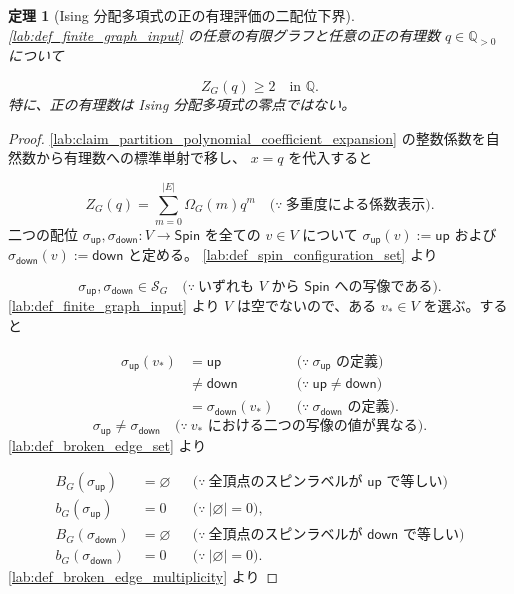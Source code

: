 \documentclass[11pt,a4paper]{article}
\newtheorem{theorem}[definition]{定理}
\theoremstyle{remark}
\begin{document}
\begin{theorem}[Ising 分配多項式の正の有理評価の二配位下界]\label{lab:theorem_no_positive_rational_root}
\cref{lab:def_finite_graph_input}
 の任意の有限グラフと任意の正の有理数 
$q\in\mathbb Q_{>0}$
 について

\[Z_G(q)\ge 2\quad\text{in }\mathbb Q.\]
特に、正の有理数は Ising 分配多項式の零点ではない。

\end{theorem}
\begin{proof}
\cref{lab:claim_partition_polynomial_coefficient_expansion}
 の整数係数を自然数から有理数への標準単射で移し、
$x=q$
 を代入すると

\[Z_G(q)
=\sum_{m=0}^{|E|}\Omega_G(m)q^m
\quad\bigl(\because\ \text{多重度による係数表示}\bigr).\]
二つの配位 
$\sigma_{\mathsf{up}},\sigma_{\mathsf{down}}:V\to\mathsf{Spin}$
 を全ての 
$v\in V$
 について 
$\sigma_{\mathsf{up}}(v):=\mathsf{up}$
 および 
$\sigma_{\mathsf{down}}(v):=\mathsf{down}$
 と定める。
\cref{lab:def_spin_configuration_set}
 より

\[\sigma_{\mathsf{up}},\sigma_{\mathsf{down}}\in\mathcal S_G
\quad\bigl(\because\ \text{いずれも }V\text{ から }\mathsf{Spin}\text{ への写像である}\bigr).\]
\cref{lab:def_finite_graph_input}
 より 
$V$
 は空でないので、ある 
$v_*\in V$
 を選ぶ。すると

\[\begin{aligned}
\sigma_{\mathsf{up}}(v_*)
&=\mathsf{up}
&&\bigl(\because\ \sigma_{\mathsf{up}}\text{ の定義}\bigr)\\
&\ne\mathsf{down}
&&\bigl(\because\ \mathsf{up}\ne\mathsf{down}\bigr)\\
&=\sigma_{\mathsf{down}}(v_*)
&&\bigl(\because\ \sigma_{\mathsf{down}}\text{ の定義}\bigr).
\end{aligned}\]
\[\sigma_{\mathsf{up}}\ne\sigma_{\mathsf{down}}
\quad\bigl(\because\ v_*\text{ における二つの写像の値が異なる}\bigr).\]
\cref{lab:def_broken_edge_set}
 より

\[\begin{aligned}
B_G(\sigma_{\mathsf{up}})
&=\varnothing
&&\bigl(\because\ \text{全頂点のスピンラベルが }\mathsf{up}\text{ で等しい}\bigr)\\
b_G(\sigma_{\mathsf{up}})
&=0
&&\bigl(\because\ |\varnothing|=0\bigr),\\[4pt]
B_G(\sigma_{\mathsf{down}})
&=\varnothing
&&\bigl(\because\ \text{全頂点のスピンラベルが }\mathsf{down}\text{ で等しい}\bigr)\\
b_G(\sigma_{\mathsf{down}})
&=0
&&\bigl(\because\ |\varnothing|=0\bigr).
\end{aligned}\]
\cref{lab:def_broken_edge_multiplicity}
 より


\end{proof}
\end{document}
